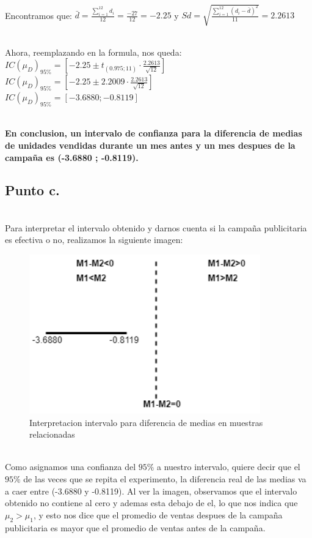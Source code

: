 \documentclass[letterpaper,12pt,onecolumn,titlepage]{article}
\begin{document}
~\\ Encontramos que: $\bar{d}=\frac{\sum\limits_{i=1}^{12}d_{i}}{12}=\frac{-27}{12}=-2.25$ y $Sd=\sqrt{\frac{\sum\limits_{i=1}^{12}(d_{i}-\bar{d})^2}{11}}=2.2613$

~\\ Ahora, reemplazando en la formula, nos queda:
~\\ $IC(\mu_{D})_{95\%}=[-2.25 \pm t_{(0.975;11)}\cdot \frac{2.2613}{\sqrt{12}}]$
~\\ $IC(\mu_{D})_{95\%}=[-2.25 \pm 2.2009 \cdot \frac{2.2613}{\sqrt{12}}]$
~\\ $IC(\mu_{D})_{95\%}=[-3.6880 ; -0.8119]$

~\\ \textbf{En conclusion, un intervalo de confianza para la diferencia de medias de unidades vendidas durante un mes antes y un mes despues de la campa\~{n}a es (-3.6880 ; -0.8119).}

\pagebreak
\subsection{Punto c.}
~\\ Para interpretar el intervalo obtenido y darnos cuenta si la campa\~{n}a publicitaria es efectiva o no, realizamos la siguiente imagen:
\begin{figure}[!h]
    \begin{center}
        \includegraphics[width=10cm]{Figuras/Grafico3.png}
        \caption{Interpretacion intervalo para diferencia de medias en muestras relacionadas}
        \label{fig:Densidad}
    \end{center}
\end{figure}

~\\ Como asignamos una confianza del $95\%$ a nuestro intervalo, quiere decir que el $95\%$ de las veces que se repita el experimento, la diferencia real de las medias va a caer entre (-3.6880 y -0.8119). Al ver la imagen, observamos que el intervalo obtenido no contiene al cero y ademas esta debajo de el, lo que nos indica que $\mu_2>\mu_1$, y esto nos dice que el promedio de ventas despues de la campa\~{n}a publicitaria es mayor que el promedio de ventas antes de la campa\~{n}a. 
\end{document}
